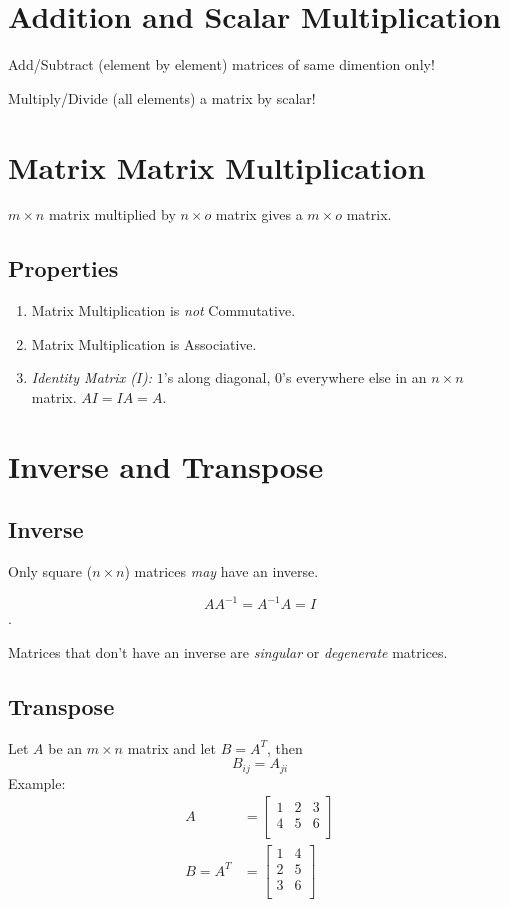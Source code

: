 \section{Addition and Scalar Multiplication}
Add/Subtract (element by element) matrices of same dimention only!

Multiply/Divide (all elements) a matrix by scalar!

\section{Matrix Matrix Multiplication}
$m \times n$ matrix multiplied by $n \times o$ matrix gives a $m \times o$ matrix.

\subsection*{Properties}
\begin{enumerate}
    \item Matrix Multiplication is \emph{not} Commutative.
    \item Matrix Multiplication is Associative.
    \item \emph{Identity Matrix ($I$):} $1$'s along diagonal, $0$'s everywhere else in an
          $n \times n$ matrix. $AI = IA = A$.
\end{enumerate}

\section{Inverse and Transpose}

\subsection*{Inverse}
Only square ($n \times n$) matrices \emph{may} have an inverse.

$$AA^{-1} = A^{-1}A = I$$.

Matrices that don't have an inverse	are \emph{singular} or \emph{degenerate} matrices.

\subsection*{Transpose}
Let $A$ be an $m \times n$ matrix and let $B = A^T$, then
$$ B_{ij} = A_{ji} $$
Example:
\begin{align*}
    A       & =	\begin{bmatrix}
        1 & 2 & 3 \\
        4 & 5 & 6 \\
    \end{bmatrix} \\
    B = A^T & =	\begin{bmatrix}
        1 & 4 \\
        2 & 5 \\
        3 & 6 \\
    \end{bmatrix} \\
\end{align*}

